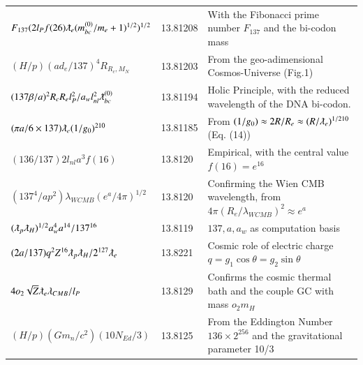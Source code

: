 \documentclass[a4paper,9pt]{article}
\begin{document}
\begin{table}
\begin{tabular}{lll}
  $F_{137} (2 l_P f(26) \lambdabar_{e}(m_{bc}^{(0)}/m_e+1)^{1/2})^{1/2}$ & 13.81208    & With the Fibonacci prime number $F_{137}$ and the bi-codon mass\\
 
 
 
  $(H/p)(ad_e/137)^4 R_{R_c,M_N} $ & 13.81203    & From the geo-adimensional Cosmos-Universe (Fig.1)\\
  
  
 
 $(137\beta/a)^2R_cR_el_P^2/a_w l_{nl}^2\lambdabar_{bc}^{(0)}$ & 13.81194    &  Holic Principle, with the reduced wavelength of the DNA bi-codon. \\
  
 
 
$(\pi a/6\times 137) \lambdabar_e (1/g_0)^{210} $ & 13.81185 & From $(1/g_0) \approx 2R/R_e \approx (R/\lambdabar_e)^{1/210}$ (Eq. (14)) \\  
     
  
 $ (136/137)2l_{nl}a^3f(16)$  & 13.8120    & Empirical, with the central value $f(16) = e^{16}$ \\ 
 
  $ (137^4/ap^2)\lambda_{WCMB}(e^a/4\pi)^{1/2}$  & 13.8120    & Confirming the Wien CMB wavelength, from $4\pi (R_e/\lambda_{WCMB})^2 \approx e^{a}$ \\ 
 
 
  
  
 $(\lambdabar_{p} \lambdabar_{H})^{1/2} a_w^4 a^{14}/137^{16}$  & 13.8119    &  $137,a,a_w$ as computation basis \\
 
 
 
 
  $(2a/137)q^2 Z^{16} \lambdabar_{p} \lambdabar_{H}/2^{127}\lambdabar_{e} $  & 13.8221    & Cosmic role of electric charge $q = g_1 \cos \theta = g_2 \sin \theta$  \\
 
 
 
 
 
 $4o_2\sqrt Z \lambdabar_{e}\lambda_{CMB}/l_P     $  & 13.8129    &Confirms the cosmic thermal bath and the couple GC with mass $o_2 m_H$    \\
 
 
 
 
 $ (H/p)(Gm_n/c^2) (10N_{Ed}/3)$ & 13.8125 & From the Eddington Number $136 \times 2^{256}$ and the gravitational parameter 10/3 \cite{Sanchez3}  \\
 

\end{tabular}
\end{table}
\end{document}
